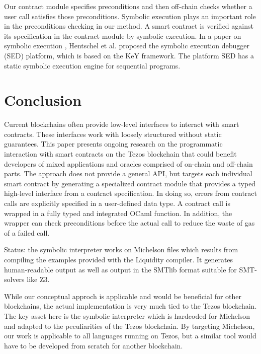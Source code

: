 \documentclass[a4paper,USenglish,american,cleveref, autoref, thm-restate]{oasics-v2021}
\begin{document}
Our contract module specifies preconditions and then off-chain checks whether a user call satisfies those preconditions. Symbolic execution plays an important role in the preconditions checking in our method. A smart contract is verified against its specification in the contract module by symbolic execution. In a paper on symbolic execution \cite{Hentschel}, Hentschel et al. proposed the symbolic execution debugger (SED) platform, which is based on the KeY framework. The platform SED has a static symbolic execution engine for sequential programs.

\section{Conclusion}
\label{sec:conclusion}

Current blockchains often provide low-level interfaces to interact
with smart contracts. These interfaces work with loosely structured
without static guarantees. This paper presents ongoing research on the
programmatic interaction with smart contracts on the Tezos blockchain
that could benefit developers of mixed applications and
oracles comprised of on-chain and off-chain parts. The approach does
not provide a general API, but targets each 
individual smart contract by generating a specialized contract module
that provides a typed high-level interface from a contract
specification. In doing so, errors from contract calls are explicitly
specified in a user-defined data type. A contract call is wrapped in a
fully typed and integrated OCaml function. In addition, the wrapper can check preconditions before the 
actual call to reduce the waste of gas of a failed call.

Status: the symbolic interpreter works on Michelson files which results from compiling the examples
provided with the Liquidity compiler. It generates human-readable output as well as output in the
SMTlib format suitable for SMT-solvers like Z3.

While our conceptual approch is applicable and would be beneficial for other blockchains, the actual
implementation is very much tied to the Tezos blockchain. The key asset here is the symbolic
interpreter which is hardcoded for Michelson and adapted to the peculiarities of the Tezos
blockchain. By targeting Michelson, our work is applicable to all languages running on Tezos, but
a similar tool would have to be developed from scratch for another blockchain.




\end{document}
